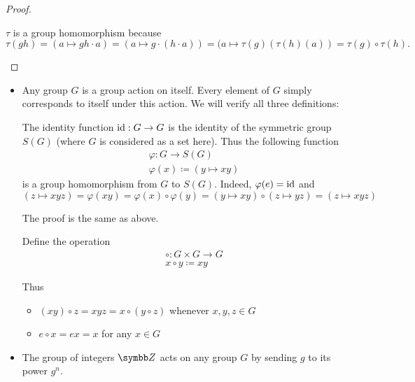\begin{proof}
\begin{description}
    \( \tau \) is a group homomorphism because
    \begin{equation*}
      \tau(g h)
      =
      (a \mapsto gh \cdot a)
      =
      (a \mapsto g \cdot (h \cdot a))
      =
      (a \mapsto \tau(g)(\tau(h)(a))
      =
      \tau(g) \circ \tau(h).
    \end{equation*}
  \end{description}
\end{proof}

\begin{example}\label{ex:group_actions}
  \begin{itemize}\mbox{}
    \item Any group \( G \) is a group action on itself. Every element of \( G \) simply corresponds to itself under this action. We will verify all three definitions:
    \begin{description}
       The identity function \( \operatorname{id}: G \to G \) is the identity of the symmetric group \( S(G) \) (where \( G \) is considered as a set here). Thus the following function
      \begin{align*}
        &\varphi: G \to S(G) \\
        &\varphi(x) \coloneqq (y \mapsto xy)
      \end{align*}
      is a group homomorphism from \( G \) to \( S(G) \). Indeed, \( \varphi(e) = \operatorname{id} \) and
      \begin{equation*}
        (z \mapsto xyz) = \varphi(xy) = \varphi(x) \circ \varphi(y) = (y \mapsto xy) \circ (z \mapsto yz) = (z \mapsto xyz)
      \end{equation*}

       The proof is the same as above.

       Define the operation
      \begin{align*}
        &\circ: G \times G \to G \\
        &x \circ y \coloneqq xy
      \end{align*}

      Thus
      \begin{itemize}
        \item \( (x y) \circ z = xyz = x \circ (y \circ z) \) whenever \( x, y, z \in G \)
        \item \( e \circ x = ex = x \) for any \( x \in G \)
      \end{itemize}
    \end{description}

    \item The group of integers \( \Z \) acts on any group \( G \) by sending \( g \) to its power \( g^n \).
  \end{itemize}
\end{example}

